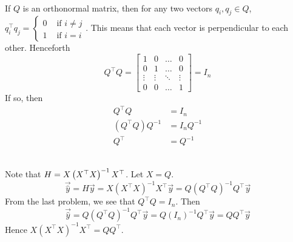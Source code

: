 \documentclass[12pt]{article}
\begin{document}
\begin{enumerate}
\newpage
{} \\
If $Q$ is an orthonormal matrix, then for any two vectors $q_i,q_j \in Q$, $q_i^\top q_j = \begin{cases} 0 &\text{ if } i \neq j \\ 1 &\text{ if } i = i \end{cases}$. This means that each vector is perpendicular to each other. Henceforth $$Q^\top Q = \begin{bmatrix} 1 & 0 & \dots & 0 \\ 0 & 1 & \dots & 0 \\ \vdots & \vdots & \ddots & \vdots \\ 0 & 0 & \dots & 1 \end{bmatrix} = I_n $$ 
If so, then $$ \begin{aligned} Q^\top Q &= I_n \\ (Q^\top Q)Q^{-1} &= I_n Q^{-1} \\ Q^\top &= Q^{-1} \end{aligned} $$ 


 \\
Note that $H = X\left(X^\top X\right)^{-1}X^\top$. Let $X=Q$.  $$\vec{\hat{y}} = H\vec{y} = X(X^\top X)^{-1}X^\top \vec{y} = Q(Q^\top Q)^{-1}Q^\top \vec{y}$$
From the last problem, we see that $Q^\top Q = I_n$. Then 
$$\vec{\hat{y}} = Q(Q^\top Q)^{-1} Q^\top \vec{y} = Q(I_n)^{-1}Q^\top\vec{y} = QQ^\top \vec{y}$$
Hence $X(X^\top X)^{-1}X^\top = QQ^\top$. 





\end{enumerate}
\end{document}
